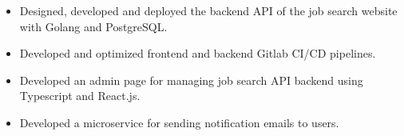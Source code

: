\begin{itemize}
    \item Designed, developed and deployed the backend API of the job search website with Golang and PostgreSQL.
    \item Developed and optimized frontend and backend Gitlab CI/CD pipelines.
    \item Developed an admin page for managing job search API backend using Typescript and React.js.
    \item Developed a microservice for sending notification emails to users.
\end{itemize}